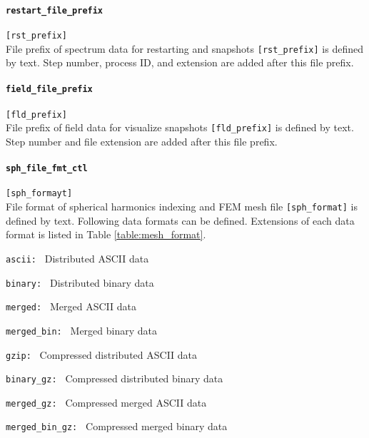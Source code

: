 \paragraph{\tt restart\_file\_prefix}
\label{href_t:restart_file_prefix}
\verb|[rst_prefix]| \\
File prefix of spectrum data for restarting and snapshots \verb|[rst_prefix]| is defined by text. Step number, process ID, and extension are added after this file prefix.

\paragraph{\tt field\_file\_prefix}
\label{href_t:field_file_prefix}
\verb|[fld_prefix]| \\
File prefix of field data for visualize snapshots \verb|[fld_prefix]| is defined by text. Step number and file extension are  added after this file prefix.

\paragraph{\tt sph\_file\_fmt\_ctl}
\label{href_t:sph_file_fmt_ctl}
\verb|[sph_formayt]| \\
File format of spherical harmonics indexing and FEM mesh file \verb|[sph_format]| is defined by text. Following data formats can be defined. Extensions of each data format is listed in Table \ref{table:mesh_format}.
%
\begin{description}
\item{\tt ascii: }   Distributed ASCII data
\item{\tt binary: }  Distributed binary data
\item{\tt merged: }  Merged ASCII data
\item{\tt merged\_bin: }   Merged binary data
\item{\tt gzip: }            Compressed distributed ASCII data
\item{\tt binary\_gz: }      Compressed distributed binary data
\item{\tt merged\_gz: }      Compressed merged ASCII data
\item{\tt merged\_bin\_gz: } Compressed merged binary data
\end{description}
%

